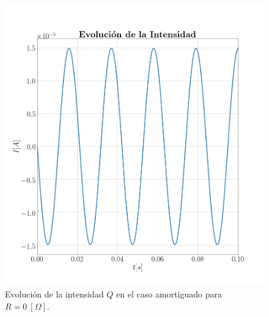 \documentclass[journal]{IEEEtran}
\begin{document}
\begin{figure}[!htb]
    \centering
    \includegraphics[width=\linewidth,trim={40 70 70 70},clip]{intensidadamortiguado.png}
    \caption{Evolución de la intensidad $Q$ en el caso amortiguado para $R=0~[\Omega]$.}
    \label{fig:intensidadamortiguado}
\end{figure}
\end{document}
